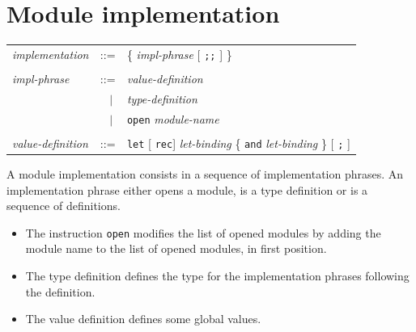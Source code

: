 \documentclass[11pt,titlepage,twoside]{report}
\newcommand{\alt}{\;|\;}
\newcommand{\Let}{\mbox{{\tt let}}}
\newcommand{\Rec}{\mbox{{\tt rec}}}
\newcommand{\And}{\mbox{{\tt and}}}
\newcommand{\term}[1]{{\tt #1}}
\newcommand{\nterm}[1]{{\em #1}}
\begin{document}
\section{Module implementation}
\begin{center}
\begin{tabular}{lcl}
\nterm{implementation}
  & ::=        & \{ \nterm{impl-phrase} [ \term{;;} ] \} 
\\ \\
\nterm{impl-phrase}
  & ::=        & \nterm{value-definition} \\ 
  & $\;\;\alt$ & \nterm{type-definition} \\
  & $\;\;\alt$ & \term{open} \nterm{module-name} 
\\ \\
\nterm{value-definition} 
  & ::=        & \term{\Let} [ \Rec ]
                 \nterm{let-binding} 
                 \{ \term{\And} \nterm{let-binding} \}
                 [ \term{;} ]
\end{tabular}
\end{center}
A module implementation consists in a sequence of implementation
phrases. An implementation phrase either opens a module, is a type
definition or is a sequence of definitions.
\begin{itemize}
\item The instruction \term{open} modifies the list of opened modules
  by adding the module name to the list of opened modules, in first
  position.
\item The type definition defines the type for the implementation
  phrases following the definition.
\item The value definition defines some global values.
\end{itemize}
\end{document}

